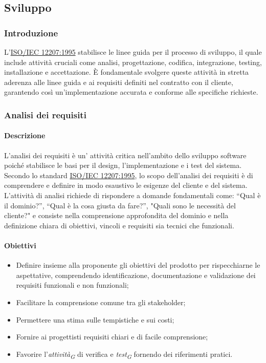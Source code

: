 \subsection{Sviluppo}

\subsubsection{Introduzione}
L'\href{https://www.math.unipd.it/~tullio/IS-1/2009/Approfondimenti/ISO_12207-1995.pdf}{ISO/IEC 12207:1995} stabilisce le linee guida per il processo di sviluppo, il quale include attività cruciali come analisi, progettazione, codifica, integrazione, testing, installazione e accettazione. È fondamentale svolgere queste attività in stretta aderenza alle linee guida e ai requisiti definiti nel contratto con il cliente, garantendo così un'implementazione accurata e conforme alle specifiche richieste.

\subsubsection{Analisi dei requisiti}
\paragraph{Descrizione}
L'analisi dei requisiti è un' attività critica nell'ambito dello sviluppo software poiché stabilisce le basi per il design, l'implementazione e i test del sistema. \\
Secondo lo standard \href{https://www.math.unipd.it/~tullio/IS-1/2009/Approfondimenti/ISO_12207-1995.pdf}{ISO/IEC 12207:1995}, lo scopo dell'analisi dei requisiti è di comprendere e definire in modo esaustivo le esigenze del cliente e del sistema. \\
L’attività di analisi richiede di rispondere a domande fondamentali come: “Qual è il dominio?”, “Qual è la cosa giusta da fare?”, "Quali sono le necessità del cliente?" e consiste nella comprensione approfondita del dominio e nella definizione chiara di obiettivi, vincoli e requisiti sia tecnici che funzionali.
\paragraph{Obiettivi}
\begin{itemize}
    \item Definire insieme alla proponente gli obiettivi del prodotto per rispecchiarne le aspettative, comprendendo identificazione, documentazione e validazione dei requisiti funzionali e non funzionali;
    \item Facilitare la comprensione comune tra gli stakeholder;
    \item Permettere una stima sulle tempistiche e sui costi;
    \item Fornire ai progettisti requisiti chiari e di facile comprensione;
    \item Favorire l'\textit{attività}\textsubscript{\textit{G}} di verifica e \textit{test}\textsubscript{\textit{G}} fornendo dei riferimenti pratici.
\end{itemize}


